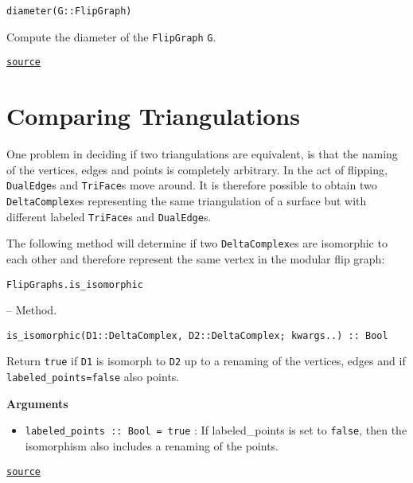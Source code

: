 \begin{adjustwidth}{2em}{0pt}


\begin{verbatim}
diameter(G::FlipGraph)
\end{verbatim}

Compute the diameter of the \texttt{FlipGraph} \texttt{G}.



\href{https://github.com/schto223/FlipGraphs.jl/blob/490c01a7adf74b42f27dda05099165c47ae8133e/src/flipGraph.jl#L602-L606}{\texttt{source}}


\end{adjustwidth}

\section{Comparing Triangulations}



\label{9598979154961159507}{}


One problem in deciding if two triangulations are equivalent, is that the naming of the vertices, edges and points is completely arbitrary. In the act of flipping, \texttt{DualEdge}s and \texttt{TriFace}s {\textquotedbl}move around{\textquotedbl}. It is therefore possible to obtain two \texttt{DeltaComplex}es representing the same triangulation of a surface but with different labeled \texttt{TriFace}s and \texttt{DualEdge}s. 



The following method will determine if two \texttt{DeltaComplex}es are isomorphic to each other and therefore represent the same vertex in the modular flip graph:


\hypertarget{11364192622904495301}{\texttt{FlipGraphs.is\_isomorphic}}  -- {Method.}

\begin{adjustwidth}{2em}{0pt}


\begin{verbatim}
is_isomorphic(D1::DeltaComplex, D2::DeltaComplex; kwargs..) :: Bool
\end{verbatim}

Return \texttt{true} if \texttt{D1} is isomorph to \texttt{D2} up to a renaming of the vertices, edges and if \texttt{labeled\_points=false} also points.

\textbf{Arguments}

\begin{itemize}
\item \texttt{labeled\_points :: Bool = true} : If labeled\_points is set to \texttt{false}, then the isomorphism also includes a renaming of the points. 

\end{itemize}


\href{https://github.com/schto223/FlipGraphs.jl/blob/490c01a7adf74b42f27dda05099165c47ae8133e/src/flipGraph.jl#L492-L499}{\texttt{source}}


\end{adjustwidth}

